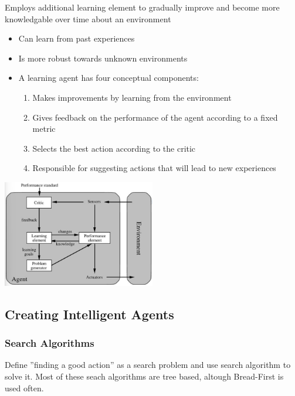 \documentclass[
../../EiKI_Summary.tex,
]
{subfiles}
\begin{document}
\begin{defbox}
    Employs additional learning element to gradually improve and become more knowledgable over time about an environment
    \begin{itemize}
        \item Can learn from past experiences
        \item Is more robust towards unknown environments
        \item A learning agent has four conceptual components:
        \begin{enumerate}
            \item {} Makes improvements by learning from the environment
            \item {} Gives feedback on the performance of the agent according to a fixed metric
            \item {} Selects the best action according to the critic
            \item {} Responsible for suggesting actions that will lead to new experiences
        \end{enumerate}
    \end{itemize}

    \begin{center}
        \includegraphics[width=0.5\textwidth]{Pics/2/LearningAgent.png}
    \end{center}
\end{defbox}

\subsection{Creating Intelligent Agents}

\subsubsection{Search Algorithms}
Define ''finding a good action'' as a search problem and use search algorithm to solve it. Most of these seach algorithms are tree based, altough Bread-First is used often.
\end{document}
